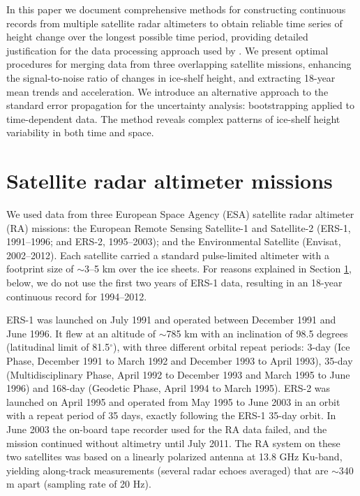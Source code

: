 In this paper we document comprehensive methods for constructing continuous records from multiple satellite radar altimeters to obtain reliable time series of height change over the longest possible time period, providing detailed justification for the data processing approach used by \textcite{Paolo2015}. We present optimal procedures for merging data from three overlapping satellite missions, enhancing the signal-to-noise ratio of changes in ice-shelf height, and extracting 18-year mean trends and acceleration. We introduce an alternative approach to the standard error propagation for the uncertainty analysis: bootstrapping applied to time-dependent data. The method reveals complex patterns of ice-shelf height variability in both time and space.

\section{Satellite radar altimeter missions}
\label{sat-ra}

We used data from three European Space Agency (ESA) satellite radar altimeter (RA) missions: the European Remote Sensing Satellite-1 and Satellite-2 (ERS-1, 1991--1996; and ERS-2, 1995--2003); and the Environmental Satellite (Envisat, 2002--2012). Each satellite carried a standard pulse-limited altimeter with a footprint size of $\sim$3--5 km over the ice sheets. For reasons explained in Section \ref{sat-ra}, below, we do not use the first two years of ERS-1 data, resulting in an 18-year continuous record for 1994--2012.

ERS-1 was launched on July 1991 and operated between December 1991 and June 1996. It flew at an altitude of $\sim$785 km with an inclination of 98.5 degrees (latitudinal limit of 81.5$^\circ$), with three different orbital repeat periods: 3-day (Ice Phase, December 1991 to March 1992 and December 1993 to April 1993), 35-day (Multidisciplinary Phase, April 1992 to December 1993 and March 1995 to June 1996) and 168-day (Geodetic Phase, April 1994 to March 1995). ERS-2 was launched on April 1995 and operated from May 1995 to June 2003 in an orbit with a repeat period of 35 days, exactly following the ERS-1 35-day orbit. In June 2003 the on-board tape recorder used for the RA data failed, and the mission continued without altimetry until July 2011. The RA system on these two satellites was based on a linearly polarized antenna at 13.8 GHz Ku-band, yielding along-track measurements (several radar echoes averaged) that are $\sim$340 m apart (sampling rate of 20 Hz).

